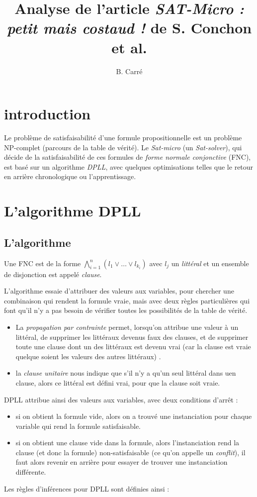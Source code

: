 \documentclass[a4paper, 10pt]{article}
\title{Analyse de l'article \emph{SAT-Micro : petit mais costaud !} de
  S. Conchon et al.}
\author{B. Carré}
\begin{document}
\maketitle


\section*{introduction}
Le problème de satisfaisabilité d'une formule propositionnelle est un
problème NP-complet (parcours de la table de vérité).
Le \emph{Sat-micro} (un \emph{Sat-solver}), qui décide de la
satisfaisabilité de ces formules de \emph{forme normale conjonctive}
(FNC), est basé sur un algorithme \emph{DPLL}, avec quelques
optimisations telles que le retour en arrière chronologique ou
l'apprentissage.

\section{L'algorithme DPLL}
\subsection{L'algorithme}
Une FNC est de la forme $\bigwedge^n_{i=1}(l_1\vee\ldots\vee l_{k_i})$
avec $l_j$ un \emph{littéral} et un ensemble de disjonction est appelé \emph{clause}.

L'algorithme essaie d'attribuer des valeurs aux variables, pour
chercher une combinaison qui rendent
la formule vraie, mais avec deux règles particulières qui font qu'il
n'y a pas besoin de vérifier toutes les possibilités de la table de
vérité.
\begin{itemize}
\item La \emph{propagation par contrainte} permet, lorsqu'on attribue
  une valeur à un littéral, de supprimer les littéraux devenus faux des
  clauses, et de supprimer toute une clause dont un des littéraux est
  devenu vrai (car la clause est vraie quelque soient les valeurs des
  autres littéraux) .
\item la \emph{clause unitaire} nous indique que s'il n'y a qu'un seul
  littéral dans uen clause, alors ce littéral est défini vrai, pour que
  la clause soit vraie.
\end{itemize}
DPLL attribue ainsi des valeurs aux variables, avec deux
conditions d'arrêt :
\begin{itemize}
\item si on obtient la formule vide, alors on a trouvé une
  instanciation pour chaque variable qui rend la formule satisfaisable.
\item si on obtient une clause vide dans la formule, alors
  l'instanciation rend la clause (et donc la formule)
  non-satisfaisable (ce qu'on appelle un \emph{conflit}), il faut
  alors revenir en arrière pour essayer de trouver une instanciation
  différente.  
\end{itemize}
Les règles d'inférences pour DPLL sont définies ainsi :
\end{document}
